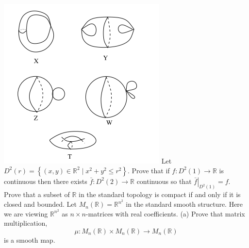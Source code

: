 \documentclass[14pt]{extarticle}
\begin{document}
\includegraphics{2022-05-23 20_49_52-topology_merge.png}
\newpage
Let $D^{2}(r)=\left\{(x, y) \in \mathbb{R}^{2} \mid x^{2}+y^{2} \leq r^{2}\right\}$. Prove that if $f: D^{2}(1) \rightarrow \mathbb{R}$ is continuous then there exists $\bar{f}: D^{2}(2) \rightarrow \mathbb{R}$ continuous so that $\left.\bar{f}\right|_{D^{2}(1)}=f$.
\newpage
Prove that a subset of $\mathbb{R}$ in the standard topology is compact if and only if it is closed and bounded.
\newpage
\newpage
Let $M_{n}(\mathbb{R})=\mathbb{R}^{n^{2}}$ in the standard smooth structure. Here we are viewing $\mathbb{R}^{n^{2}}$ as $n \times n$-matrices with real coefficients.
(a) Prove that matrix multiplication,
$$
\mu: M_{n}(\mathbb{R}) \times M_{n}(\mathbb{R}) \rightarrow M_{n}(\mathbb{R})
$$
is a smooth map.
\end{document}

